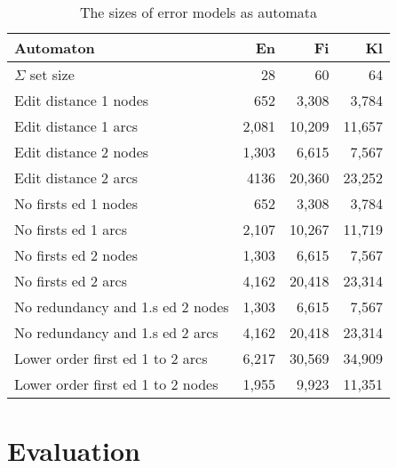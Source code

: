 \documentclass[free]{flammie}
\begin{document}
\begin{table}[h]
\begin{center}
\begin{scriptsize}
\begin{tabular}{|l|rrr|}
\hline
\bf Automaton & \bf En & \bf Fi & \bf Kl  \\ 
\hline
$\Sigma$ set size &
 28& 60& 64
\\
Edit distance 1 nodes &
 652& 3,308& 3,784
\\
Edit distance 1 arcs &
 2,081& 10,209& 11,657
\\
Edit distance 2 nodes &
 1,303& 6,615& 7,567
\\
Edit distance 2 arcs &
 4136& 20,360& 23,252
\\
No firsts ed 1 nodes & 
 652& 3,308& 3,784
\\
No firsts ed 1 arcs & 
 2,107& 10,267& 11,719
\\
No firsts ed 2 nodes &
 1,303& 6,615& 7,567
\\
No firsts ed 2 arcs &
 4,162& 20,418& 23,314
\\
No redundancy and 1.s ed 2 nodes &
 1,303& 6,615& 7,567
\\
No redundancy and 1.s ed 2 arcs &
 4,162& 20,418& 23,314
\\
Lower order first ed 1 to 2 arcs &
6,217 & 30,569 & 34,909
\\
Lower order first ed 1 to 2 nodes &
1,955 & 9,923 & 11,351
\\
\hline
\end{tabular}
\end{scriptsize}
\end{center}
\caption{\label{table:error-sizes}
The sizes of error models as automata}
\end{table}


\section{Evaluation}
\label{sec:evaluation}
\end{document}
